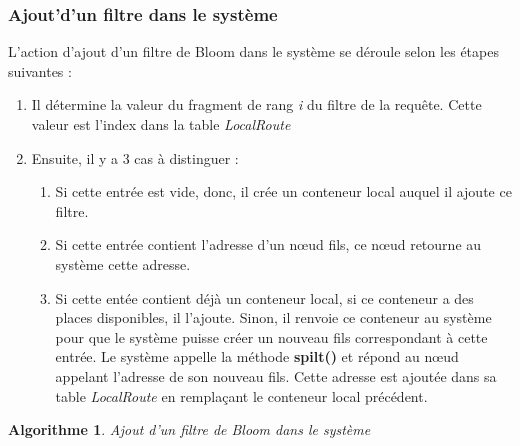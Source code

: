 \documentclass[a4paper,11pt]{report}
\begin{document}
\subsubsection{Ajout'd'un filtre dans le système}
	L'action d'ajout d'un filtre de Bloom dans le système se déroule selon les étapes suivantes : 
	\begin{enumerate}
		\item Il détermine la valeur du fragment de rang \textit{i} du filtre de la requête. Cette valeur est l'index dans la table \textit{LocalRoute}
		\item Ensuite, il y a 3 cas à distinguer :
			\begin{enumerate}
				\item Si cette entrée est vide, donc, il crée un conteneur local auquel il ajoute ce filtre.
				\item Si cette entrée contient l'adresse d'un nœud fils, ce nœud retourne au système cette adresse.
				\item Si cette entée contient déjà un conteneur local, si ce conteneur a des places disponibles, il l'ajoute. Sinon, il renvoie ce conteneur au système pour que le système puisse créer un nouveau fils correspondant à cette entrée. Le système appelle la méthode \textbf{spilt()} et répond au nœud appelant l'adresse de son nouveau fils. Cette adresse est ajoutée dans sa table \textit{LocalRoute} en remplaçant le conteneur local précédent.
			\end{enumerate}
\end{enumerate}

\newtheorem{algorithme}{Algorithme}
\begin{algorithme}
	Ajout d'un filtre de Bloom dans le système
\end{algorithme}
\end{document}
